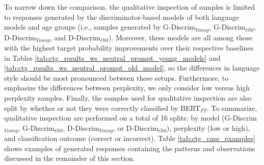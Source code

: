 To narrow down the comparison, the qualitative inspection of samples is limited to responses generated by the discriminator-based models of both language models and age groups (i.e., samples generated by G-Discrim$_{Young}$, G-Discrim$_{Old}$, D-Discrim$_{Young}$, and D-Discrim$_{Old}$). Moreover, these models are all among those with the highest target probability improvements over their respective baselines in Tables \ref{tab:ctg_results_ws_neutral_prompt_young_models} and \ref{tab:ctg_results_ws_neutral_prompt_old_model}, so the differences in language style should be most pronounced between these setups. Furthermore, to emphasize the differences between perplexity, we only consider low versus high perplexity samples. Finally, the samples used for qualitative inspection are also split by whether or not they were correctly classified by BERT$_{FT}$. To summarize, qualitative inspection are performed on a total of 16 splits: by model (G-Discrim$_{Young}$, G-Discrim$_{Old}$, D-Discrim$_{Young}$, or D-Discrim$_{Old}$), perplexity (low or high), and classification outcome (correct or incorrect). Table \ref{tab:ctg_case_examples} shows examples of generated responses containing the patterns and observations discussed in the remainder of this section.


